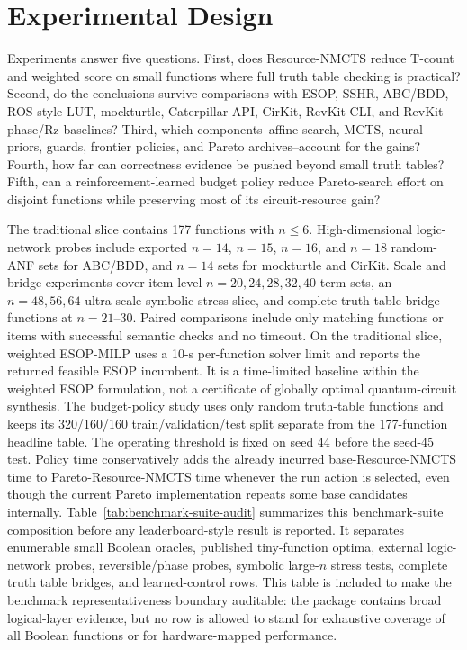 \documentclass[11pt]{article}
\newcommand{\method}{Resource-NMCTS}
\newcommand{\mcts}{\ensuremath{\mathrm{MCTS}}}
\newcommand{\ttable}{truth table}
\begin{document}
\section{Experimental Design}

Experiments answer five questions.  First, does \method{} reduce T-count and
weighted score on small functions where full \ttable{} checking is practical?
Second, do the conclusions survive comparisons with ESOP, SSHR, ABC/BDD,
ROS-style LUT, mockturtle, Caterpillar API, CirKit, RevKit CLI, and RevKit
phase/Rz baselines?
Third, which components--affine search, \mcts{}, neural priors, guards,
frontier policies, and Pareto archives--account for the gains?  Fourth, how far
can correctness evidence be pushed beyond small truth tables?  Fifth, can a
reinforcement-learned budget policy reduce Pareto-search effort on disjoint
functions while preserving most of its circuit-resource gain?

The traditional slice contains 177 functions with $n\leq 6$.  High-dimensional
logic-network probes include exported $n=14$, $n=15$, $n=16$, and $n=18$
random-ANF sets for ABC/BDD, and $n=14$ sets for mockturtle and CirKit.  Scale
and bridge experiments cover item-level $n=20,24,28,32,40$ term sets, an
$n=48,56,64$ ultra-scale symbolic stress slice, and complete \ttable{} bridge
functions at $n=21$--$30$.  Paired comparisons include only
matching functions or items with successful semantic checks and no timeout.
On the traditional slice, weighted ESOP-MILP uses a 10-s per-function solver
limit and reports the returned feasible ESOP incumbent.  It is a time-limited
baseline within the weighted ESOP formulation, not a certificate of globally
optimal quantum-circuit synthesis.
The budget-policy study uses only random truth-table functions and keeps its
320/160/160 train/validation/test split separate from the 177-function
headline table.  The operating threshold is fixed on seed 44 before the seed-45
test.  Policy time conservatively adds the already incurred base-\method{} time
to Pareto-\method{} time whenever the run action is selected, even though the
current Pareto implementation repeats some base candidates internally.
Table~\ref{tab:benchmark-suite-audit} summarizes this benchmark-suite
composition before any leaderboard-style result is reported.  It separates
enumerable small Boolean oracles, published tiny-function optima, external
logic-network probes, reversible/phase probes, symbolic large-$n$ stress
tests, complete \ttable{} bridges, and learned-control rows.  This table is
included to make the benchmark representativeness boundary auditable: the
package contains broad logical-layer evidence, but no row is allowed to stand
for exhaustive coverage of all Boolean functions or for hardware-mapped
performance.
\end{document}
